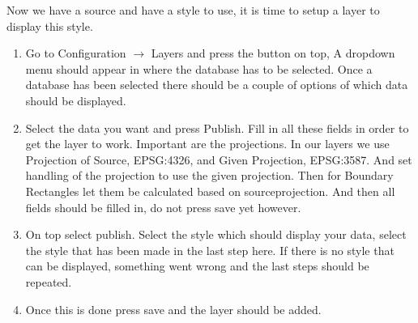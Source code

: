 Now we have a source and have a style to use, it is time to setup a layer to display this style. 
\begin{enumerate}
	\item Go to Configuration $\rightarrow$ Layers and press the button on top, A dropdown menu should appear in where the database has to be selected.  Once a database has been selected there should be a couple of options of which data should be displayed.
	\item Select the data you want and press Publish. Fill in all these fields in order to get the layer to work. Important are the projections. In our layers we use Projection of Source, EPSG:4326, and Given Projection, EPSG:3587. And set handling of the projection to use the given projection. Then for Boundary Rectangles let them be calculated based on sourceprojection. And then all fields should be filled in, do not press save yet however. 
	\item On top select publish. Select the style which should display your data, select the style that has been made in the last step here. If there is no style that can be displayed, something went wrong and the last steps should be repeated.
	\item Once this is done press save and the layer should be added.
\end{enumerate}
